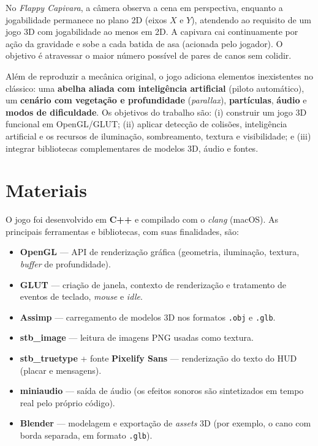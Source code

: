 \documentclass[12pt]{article}
\begin{document}
No \emph{Flappy Capivara}, a câmera observa a cena em perspectiva, enquanto
a jogabilidade permanece no plano 2D (eixos $X$ e $Y$), atendendo ao
requisito de um jogo 3D com jogabilidade ao menos em 2D. A capivara cai
continuamente por ação da gravidade e sobe a cada batida de asa (acionada
pelo jogador). O objetivo é atravessar o maior número possível de pares de
canos sem colidir.

Além de reproduzir a mecânica original, o jogo adiciona elementos
inexistentes no clássico: uma \textbf{abelha aliada com inteligência
artificial} (piloto automático),
um \textbf{cenário com vegetação e profundidade} (\emph{parallax}),
\textbf{partículas}, \textbf{áudio} e \textbf{modos de dificuldade}. Os
objetivos do trabalho
são: (i) construir um jogo 3D funcional em OpenGL/GLUT; (ii) aplicar
detecção de colisões, inteligência artificial e os recursos de iluminação,
sombreamento, textura e visibilidade; e (iii) integrar bibliotecas
complementares de modelos 3D, áudio e fontes.

\section{Materiais}

O jogo foi desenvolvido em \textbf{C++} e compilado com o \emph{clang}
(macOS). As principais ferramentas e bibliotecas, com suas finalidades,
são:

\begin{itemize}
  \item \textbf{OpenGL} --- API de renderização gráfica (geometria,
        iluminação, textura, \emph{buffer} de profundidade).
  \item \textbf{GLUT} --- criação de janela, contexto de renderização e
        tratamento de eventos de teclado, \emph{mouse} e \emph{idle}.
  \item \textbf{Assimp} --- carregamento de modelos 3D nos formatos
        \texttt{.obj} e \texttt{.glb}.
  \item \textbf{stb\_image} --- leitura de imagens PNG usadas como textura.
  \item \textbf{stb\_truetype} + fonte \textbf{Pixelify Sans} --- renderização
        do texto do HUD (placar e mensagens).
  \item \textbf{miniaudio} --- saída de áudio (os efeitos sonoros são
        sintetizados em tempo real pelo próprio código).
  \item \textbf{Blender} --- modelagem e exportação de \emph{assets} 3D
        (por exemplo, o cano com borda separada, em formato \texttt{.glb}).
\end{itemize}
\end{document}
